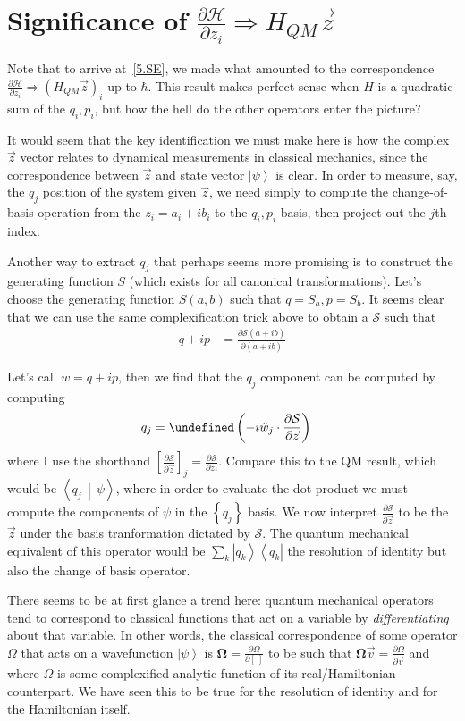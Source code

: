 \documentclass[12pt]{report}
\newcommand*{\dotp}[2]{\left<#1\,\middle|\,#2\right>}
\newcommand*{\pd}[2]{\frac{\partial#1}{\partial#2}}
\newcommand*{\bra}[1]{\left<#1\right|}
\newcommand*{\ket}[1]{\left|#1\right>}
\let\Re\undefined
\DeclareMathOperator{\Re}{Re}
\begin{document}
\section{Significance of $\pd{\mathcal{H}}{z_i} \Rightarrow H_{QM}\vec{z}$}

Note that to arrive at~\eqref{5.SE}, we made what amounted to the correspondence
$\pd{\mathcal{H}}{z_i} \Rightarrow \left( H_{QM}\vec{z} \right)_i$ up to
$\hbar$. This result makes perfect sense when $H$ is a quadratic sum of the
$q_i, p_i$, but how the hell do the other operators enter the picture?

It would seem that the key identification we must make here is how the complex
$\vec{z}$ vector relates to dynamical measurements in classical mechanics, since
the correspondence between $\vec{z}$ and state vector $\ket{\psi}$ is clear. In
order to measure, say, the $q_j$ position of the system given $\vec{z}$, we need
simply to compute the change-of-basis operation from the $z_i = a_i + ib_i$ to
the $q_i, p_i$ basis, then project out the $j$th index.

Another way to extract $q_j$ that perhaps seems more promising is to construct
the generating function $S$ (which exists for all canonical transformations).
Let's choose the generating function $S(a,b)$ such that $q = S_a, p=S_b$. It
seems clear that we can use the same complexification trick above to obtain a
$\mathcal{S}$ such that
\begin{align}
    q + ip &= \pd{\mathcal{S}(a + ib)}{(a+ib)}
\end{align}

Let's call $w=q+ip$, then we find that the $q_j$ component can be computed by computing
\begin{align}
    q_j &= \Re\left(-i\hat{w}_j \cdot \pd{\mathcal{S}}{\vec{z}}\right)
\end{align}
where I use the shorthand
$\left[ \pd{\mathcal{S}}{\vec{z}} \right]_j = \pd{\mathcal{S}}{z_j}$. Compare
this to the QM result, which would be $\dotp{q_j}{\psi}$, where in order to
evaluate the dot product we must compute the components of $\psi$ in the
$\left\{ q_j \right\}$ basis. We now interpret $\pd{\mathcal{S}}{\vec{z}}$ to be
the $\vec{z}$ under the basis tranformation dictated by $\mathcal{S}$. The
quantum mechanical equivalent of this operator would be $\sum_k
\ket{q_k}\bra{q_k}$ the resolution of identity but also the change of basis
operator.

There seems to be at first glance a trend here: quantum mechanical operators
tend to correspond to classical functions that act on a variable by
\emph{differentiating} about that variable. In other words, the classical
correspondence of some operator $\Omega$ that acts on a wavefunction
$\ket{\psi}$ is $\mathbf{\Omega} = \pd{\Omega}{[~]}$ to be such that
$\mathbf{\Omega}\vec{v} = \pd{\Omega}{\vec{v}}$ and where $\Omega$ is some
complexified analytic function of its real/Hamiltonian counterpart. We have seen
this to be true for the resolution of identity and for the Hamiltonian itself.
\end{document}
